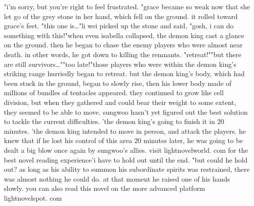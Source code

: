 "i'm sorry, but you're right to feel frustrated.
"grace became so weak now that she let go of the grey stone in her hand, which fell on the ground.
 it rolled toward grace's feet.
"this one is…"li wei picked up the stone and said, "gosh, i can do something with this!"when even isabella collapsed, the demon king cast a glance on the ground.
 then he began to chase the enemy players who were almost near death.
 in other words, he got down to killing the remnants.
 "retreat!""but there are still survivors…""too late!"those players who were within the demon king's striking range hurriedly began to retreat.
 but the demon king's body, which had been stuck in the ground, began to slowly rise, then his lower body made of millions of bundles of tentacles appeared.
 they continued to grow like cell division, but when they gathered and could bear their weight to some extent, they seemed to be able to move.
sungwoo hasn't yet figured out the best solution to tackle the current difficulties.
'the demon king's going to finish it in 20 minutes.
'the demon king intended to move in person, and attack the players.
he knew that if he lost his control of this area 20 minutes later, he was going to be dealt a big blow once again by sungwoo's allies.
visit lightnovelworld.
com for the best novel reading experience'i have to hold out until the end.
"but could he hold out? as long as his ability to summon his subordinate spirits was restrained, there was almost nothing he could do.
at that moment he raised one of his hands slowly.
 you can also read this novel on the more advanced platform lightnovelspot.
com

 